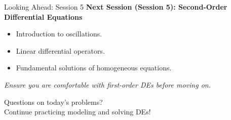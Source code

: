 \documentclass[10pt,aspectratio=169]{beamer}
\newcommand{\emphasis}[1]{\textit{#1}}
\begin{document}
\begin{frame}{Looking Ahead: Session 5}
    \textbf{Next Session (Session 5): Second-Order Differential Equations}
    \begin{itemize}
        \item Introduction to oscillations.
        \item Linear differential operators.
        \item Fundamental solutions of homogeneous equations.
    \end{itemize}
    \emphasis{Ensure you are comfortable with first-order DEs before moving on.}
\end{frame}

\begin{frame}[standout]
    Questions on today's problems? \\
    Continue practicing modeling and solving DEs!
\end{frame}
\end{document}
